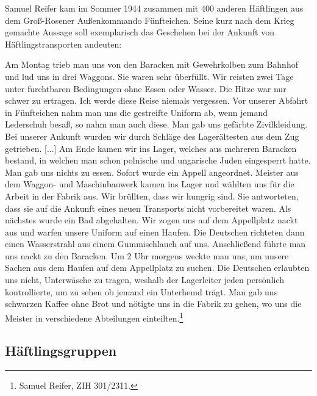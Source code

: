 Samuel Reifer kam im Sommer 1944 zusammen mit 400 anderen Häftlingen aus dem Groß-Rosener Außenkommando Fünfteichen. Seine kurz nach dem Krieg gemachte Aussage soll exemplarisch das Geschehen bei der Ankunft von Häftlingstransporten andeuten:
\begin{leftbar}
Am Montag trieb man uns von den Baracken mit Gewehrkolben zum Bahnhof und lud uns in drei Waggons.
Sie waren sehr überfüllt. Wir reisten zwei Tage unter furchtbaren Bedingungen ohne Essen oder Wasser. Die Hitze war nur schwer zu ertragen. Ich werde diese Reise niemals vergessen. Vor unserer Abfahrt in Fünfteichen nahm man uns die gestreifte Uniform ab, wenn jemand Lederschuh besaß, so nahm man auch diese. Man gab uns gefärbte Zivilkleidung.
Bei unserer Ankunft wurden wir durch Schläge des Lagerältesten aus dem Zug getrieben. [...]
Am Ende kamen wir ins Lager, welches aus mehreren Baracken bestand, in welchen man schon polnische und ungarische Juden eingesperrt hatte. Man gab uns nichts zu essen. Sofort wurde ein Appell angeordnet. Meister aus dem Waggon- und Maschinbauwerk kamen ins Lager und wählten uns für die Arbeit in der Fabrik aus. Wir brüllten, dass wir hungrig sind. Sie antworteten, dass sie auf die Ankunft eines neuen Transports nicht vorbereitet waren.
Als nächstes wurde ein Bad abgehalten. Wir zogen uns auf dem Appellplatz nackt aus und warfen unsere Uniform auf einen Haufen. Die Deutschen richteten dann einen Wasserstrahl aus einem Gummischlauch auf uns. Anschließend führte man uns nackt zu den Baracken. Um 2 Uhr morgens weckte man uns, um unsere Sachen aus dem Haufen auf dem Appellplatz zu suchen. Die Deutschen erlaubten uns nicht, Unterwäsche zu tragen, weshalb der Lagerleiter jeden persönlich kontrollierte, um zu sehen ob jemand ein Unterhemd trägt. Man gab uns schwarzen Kaffee ohne Brot und nötigte uns in die Fabrik zu gehen, wo uns die Meister in verschiedene Abteilungen einteilten.\footnote{Samuel Reifer, ZIH 301/2311.}
\end{leftbar}





\subsection{Häftlingsgruppen}


